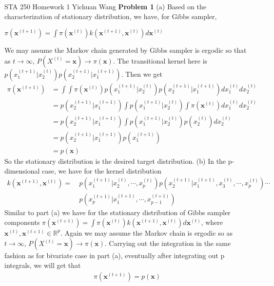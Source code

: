 \documentclass[12pt]{article}
\begin{document}
\noindent STA 250 Homework 1 \newline Yichuan Wang \newline \newline
\textbf{Problem 1} \newline
(a) Based on the characterization of stationary distribution, we have, for Gibbs sampler, 
\begin{center}
	$\pi(\mathbf{x}^{(t+1)}) = \int \pi(\mathbf{x}^{(t)})k(\mathbf{x}^{(t+1)}, \mathbf{x}^{(t)})d\mathbf{x}^{(t)}$
\end{center}
We may assume the Markov chain generated by Gibbs sampler is ergodic so that as $t \rightarrow \infty$, $P(X^{(t)} = \mathbf{x}) \rightarrow \pi(\mathbf x)$. The transitional kernel here is $p(x_1^{(t+1)}|x_2^{(t)})p(x_2^{(t+1)}|x_1^{(t+1)})$. Then we get
\begin{align*}
	\pi(\mathbf{x}^{(t+1)}) &=  \int \int \pi(\mathbf{x}^{(t)})p(x_1^{(t+1)}|x_2^{(t)})p(x_2^{(t+1)}|x_1^{(t+1)})dx_1^{(t)} dx_2^{(t)} \\
	&= p(x_2^{(t+1)}|x_1^{(t+1)})  \int p(x_1^{(t+1)}|x_2^{(t)}) \int \pi(\mathbf{x}^{(t)}) dx_1^{(t)} dx_2^{(t)} \\
	&= p(x_2^{(t+1)}|x_1^{(t+1)})  \int p(x_1^{(t+1)}|x_2^{(t)}) p(x_2^{(t)}) dx_2^{(t)} \\
	&= p(x_2^{(t+1)}|x_1^{(t+1)}) p(x_1^{(t+1)}) \\
	&= p(\mathbf{x})
\end{align*}
So the stationary distribution is the desired target distribution. \newline
(b) In the p-dimensional case, we have for the kernel distribution
\begin{align*}
	k(\mathbf{x}^{(t+1)}, \mathbf{x}^{(t)}) =\ &p(x_1^{(t+1)}|x_2^{(t)}, \cdots, x_p^{(t)})p(x_2^{(t+1)}|x_1^{(t+1)}, x_3^{(t)}, \cdots, x_p^{(t)}) 		\cdots \\
	&p(x_p^{(t+1)}|x_1^{(t+1)}, \cdots, x_{p-1}^{(t+1)})
\end{align*}
Similar to part (a) we have for the stationary distribution of Gibbs sampler components $\pi(\mathbf{x}^{(t+1)}) = \int \pi(\mathbf{x}^{(t)})k(\mathbf{x}^{(t+1)}, \mathbf{x}^{(t)})d\mathbf{x}^{(t)}$, where $\mathbf{x}^{(t)}, \mathbf{x}^{(t+1)} \in \mathbb{R}^p$. Again we may assume the Markov chain is ergodic so as $t \rightarrow \infty$, $P(X^{(t)} = \mathbf{x}) \rightarrow \pi(\mathbf x)$. Carrying out the integration in the same fashion as for bivariate case in part (a), eventually after integrating out p integrals, we will get that
\begin{align*}
	\pi(\mathbf{x}^{(t+1)}) = p(\mathbf x)
\end{align*}
\end{document}
